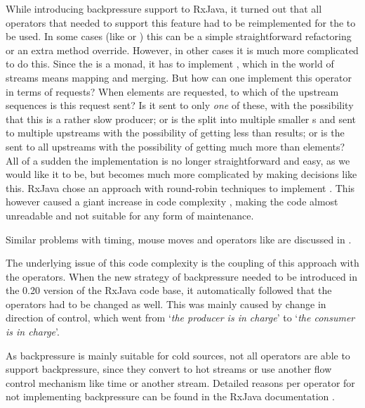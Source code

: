 While introducing backpressure support to RxJava, it turned out that all operators that needed to support this feature had to be reimplemented for the  to be used. In some cases (like  or ) this can be a simple straightforward refactoring or an extra method override. However, in other cases it is much more complicated to do this. Since the \obs is a monad, it has to implement , which in the world of streams means mapping and merging. But how can one implement this  operator in terms of requests? When  elements are requested, to which of the  upstream \obs sequences is this request sent? Is it sent to only \emph{one} of these, with the possibility that this is a rather slow producer; or is the  split into multiple smaller s and sent to multiple upstreams with the possibility of getting less than  results; or is the  sent to all upstreams with the possibility of getting much more than  elements? All of a sudden the implementation is no longer straightforward and easy, as we would like it to be, but becomes much more complicated by making decisions like this. RxJava chose an approach with round-robin techniques to implement . This however caused a giant increase in code complexity \cite{RxJava-source-code}, making the code almost unreadable and not suitable for any form of maintenance.

Similar problems with timing, mouse moves and operators like  are discussed in \cite{meijer2014-Derivation}.

The underlying issue of this code complexity is the coupling of this approach with the operators. When the new strategy of backpressure needed to be introduced in the 0.20 version of the RxJava code base, it automatically followed that the operators had to be changed as well. This was mainly caused by change in direction of control, which went from `\textit{the producer is in charge}' to `\textit{the consumer is in charge}'.

As backpressure is mainly suitable for cold sources, not all operators are able to support backpressure, since they convert to hot streams or use another flow control mechanism like time or another stream. Detailed reasons per operator for not implementing backpressure can be found in the RxJava documentation \cite{rx-api}.

